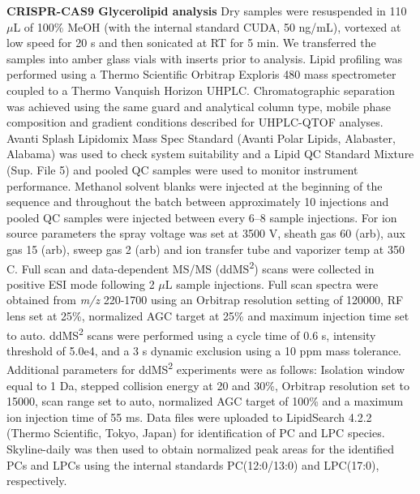 \documentclass[9pt,twocolumn,twoside,lineno]{BioRxiv}
\begin{document}
\textbf{CRISPR-CAS9 Glycerolipid analysis}
Dry samples were resuspended in 110 $\mu$L of 100\% MeOH (with the internal standard CUDA, 50 ng/mL), vortexed at low speed for 20 s and then sonicated at RT for 5 min. 
We transferred the samples into amber glass vials with inserts prior to analysis. 
Lipid profiling was performed using a Thermo Scientific Orbitrap Exploris 480 mass spectrometer coupled to a Thermo Vanquish Horizon UHPLC. Chromatographic separation was achieved using the same guard and analytical column type, mobile phase composition and gradient conditions described for UHPLC-QTOF analyses. 
Avanti Splash Lipidomix Mass Spec Standard (Avanti Polar Lipids, Alabaster, Alabama) was used to check system suitability and a Lipid QC Standard Mixture (Sup. File 5) and pooled QC samples were used to monitor instrument performance. 
Methanol solvent blanks were injected at the beginning of the sequence and throughout the batch between approximately 10 injections and pooled QC samples were injected between every 6–8 sample injections. For ion source parameters the spray voltage was set at 3500 V, sheath gas 60 (arb), aux gas 15 (arb), sweep gas 2 (arb) and ion transfer tube and vaporizer temp at 350 \degree C. 
Full scan and data-dependent MS/MS (ddMS\textsuperscript{2}) scans were collected in positive ESI mode following 2 $\mu$L sample injections. 
Full scan spectra were obtained from \textit{m/z} 220-1700 using an Orbitrap resolution setting of 120000, RF lens set at 25\%, normalized AGC target at 25\% and maximum injection time set to auto. 
ddMS\textsuperscript{2} scans were performed using a cycle time of 0.6 s, intensity threshold of 5.0e4, and a 3 s dynamic exclusion using a 10 ppm mass tolerance. 
Additional parameters for ddMS\textsuperscript{2} experiments were as follows: Isolation window equal to 1 Da, stepped collision energy at 20 and 30\%, Orbitrap resolution set to 15000, scan range set to auto, normalized AGC target of 100\% and a maximum ion injection time of 55 ms. 
Data files were uploaded to LipidSearch 4.2.2 (Thermo Scientific, Tokyo, Japan) for identification of PC and LPC species. 
Skyline-daily \cite{Adams2020-em} was then used to obtain normalized peak areas for the identified PCs and LPCs using the internal standards PC(12:0/13:0) and LPC(17:0), respectively.
\end{document}
